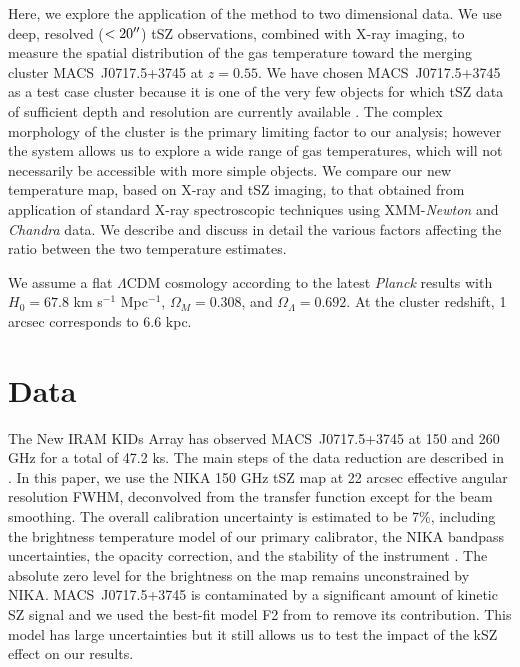 \documentclass[twocolumn,traditabstract]{aa}
\newcommand{\ccor}[1]{\textcolor{Mypink}{#1}}
\begin{document}
\ccor{Here, we explore the application of the method to two dimensional data.} We use deep, resolved ($< 20\hbox{$^{\prime\prime}$}$) tSZ observations, combined with X-ray imaging, to measure the spatial distribution of the gas temperature toward the merging cluster \mbox{MACS~J0717.5+3745} at $z=0.55$. We have chosen \mbox{MACS~J0717.5+3745} \ccor{as a test case cluster} because it is one of the very few objects \ccor{for which tSZ data of sufficient depth and resolution} are currently available \citep{Adam2016b}. The complex morphology of the cluster is the primary limiting factor to our analysis; however \ccor{the system} allows us to explore a wide range of gas temperatures, which will not necessarily be accessible with more simple objects. \ccor{We compare our new temperature map, based on X-ray and tSZ imaging, to that obtained from application of standard X-ray spectroscopic techniques using XMM-\textit{Newton} and \textit{Chandra} data. We describe and discuss in detail the various factors affecting the ratio between the two temperature estimates.}

We assume a flat $\Lambda$CDM cosmology according to the latest {\it Planck} results \citep{Planck2015XIII} with $H_0 = 67.8$ km s$^{-1}$ Mpc$^{-1}$, $\Omega_M = 0.308$, and $\Omega_{\Lambda} = 0.692$. At the cluster redshift, 1 arcsec corresponds to 6.6 kpc.

\section{Data}\label{sec:data}
The New IRAM KIDs Array \citep[NIKA, see][]{Monfardini2011,Calvo2013,Adam2014,Catalano2014} has observed \mbox{MACS~J0717.5+3745} at 150 and 260 GHz for a total of 47.2 ks. The main steps of the data reduction are described in \cite{Adam2015,Adam2016a,Adam2016b,Ruppin2016}. In this paper, we use the NIKA 150 GHz tSZ map at 22 arcsec effective angular resolution FWHM, deconvolved from the transfer function except for the beam smoothing. The overall calibration uncertainty is estimated to be 7\%, including the brightness temperature model of our primary calibrator, the NIKA bandpass uncertainties, the opacity correction, and the stability of the instrument \citep{Catalano2014}. The absolute zero level for the brightness on the map remains unconstrained by NIKA. \mbox{MACS~J0717.5+3745} is contaminated by a significant amount of kinetic SZ \citep[kSZ,][]{Sunyaev1980} signal and we used the best-fit model F2 from \cite{Adam2016b} to remove its contribution. This model has large uncertainties but it still allows us to test the impact of the kSZ effect on our results.
\end{document}
